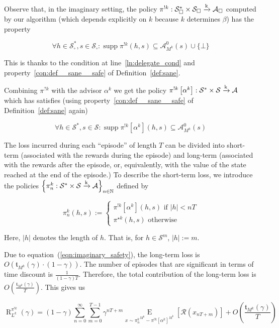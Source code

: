 \documentclass[anon,12pt]{colt2018} %
\DeclareMathOperator{\Supp}{supp}
\newcommand{\AP}[1]{\left(#1\right)}
\newcommand{\AB}[1]{\left[#1\right]}
\newcommand{\AC}[1]{\left\{#1\right\}}
\newcommand{\Ea}[2]{\underset{#1}{\operatorname{E}}\AB{#2}}
\newcommand{\Nats}{\mathbb{N}}
\newcommand{\Abs}[1]{\left\vert #1 \right\vert}
\newcommand{\K}{\xrightarrow{\textnormal{k}}}
\newcommand{\A}{\mathcal{A}}
\newcommand{\St}{\mathcal{S}}
\newcommand{\R}{\mathcal{R}}
\newcommand{\Rg}{\operatorname{R}}
\newcommand{\Tn}{\mathfrak{t}}
\newcommand{\IP}{\pi^{!k}}
\begin{document}
Observe that, in the imaginary setting, the policy $\IP: \St_\square^* \times \St_\square \K \A_\square$ computed by our algorithm (which depends explicitly on $k$ because $k$ determines $\beta$) has the property

\begin{equation}
\forall h\in\St_\square^*,s\in\St_\square: \Supp{\IP(h,s)} \subseteq \A_{M^k}^0(s)\cup\{\bot\}
\end{equation}

This is thanks to the condition at line~\ref{ln:delegate_cond} and property~\ref{con:def__sane__safe} of Definition~\ref{def:sane}.

Combining $\pi^{?k}$ with the advisor $\alpha^k$ we get the policy $\IP\AB{\alpha^k}: \St^*\times\St\K\A$ which has satisfies (using property~\ref{con:def__sane__safe} of Definition~\ref{def:sane} again)

\begin{equation}
\label{eqn:imaginary_safety}
\forall h\in\St^*,s\in\St: \Supp{\IP\AB{\alpha^k}(h,s)} \subseteq \A_{M^k}^0(s)
\end{equation}

The loss incurred during each \enquote{episode} of length $T$ can be divided into short-term (associated with the rewards during the episode) and long-term (associated with the rewards after the episode, or, equivalently, with the value of the state reached at the end of the episode.) To describe the short-term loss, we introduce the policies $\AC{\pi_n^k: \St^* \times \St \K \A}_{n \in \Nats}$ defined by

\begin{equation}
\pi_n^k(h,s):=\begin{cases} \IP\AB{\alpha^k}(h,s) \text{ if } \Abs{h} < nT \\ \pi^{\star k}(h,s) \text{ otherwise} \end{cases}
\end{equation}

Here, $\Abs{h}$ denotes the length of $h$. That is, for $h \in \St^m$, $\Abs{h}:=m$.

Due to equation~(\ref{eqn:imaginary_safety}), the long-term loss is $O\AP{\Tn_{M^k}(\gamma)\cdot(1-\gamma)}$. The number of episodes that are significant in terms of time discount is $\frac{1}{(1-\gamma)T}$. Therefore, the total contribution of the long-term loss is $O\AP{\frac{\Tn_{M^k}(\gamma)}{T}}$. This gives us

\begin{equation}
\Rg_{L^k}^{\IP}(\gamma) = (1-\gamma)\sum_{n=0}^\infty \sum_{m=0}^{T-1} \gamma^{nT+m}\Ea{x\sim{\pi_n^k}^{M^k}-\pi^{!k}\AB{\alpha^k}^{M^k}}{\R\AP{x_{nT+m}}}+O\AP{\frac{\Tn_{M^k}(\gamma)}{T}}
\end{equation}
\end{document}
